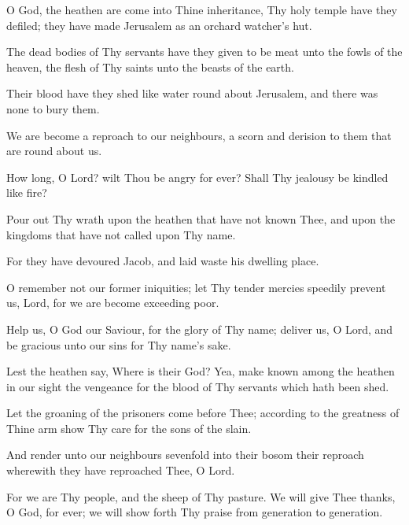 O God, the heathen are come into Thine inheritance, Thy holy temple have they defiled; they have made Jerusalem as an orchard watcher’s hut.

The dead bodies of Thy servants have they given to be meat unto the fowls of the heaven, the flesh of Thy saints unto the beasts of the earth.

Their blood have they shed like water round about Jerusalem, and there was none to bury them.

We are become a reproach to our neighbours, a scorn and derision to them that are round about us.

How long, O Lord? wilt Thou be angry for ever? Shall Thy jealousy be kindled like fire?

Pour out Thy wrath upon the heathen that have not known Thee, and upon the kingdoms that have not called upon Thy name.

For they have devoured Jacob, and laid waste his dwelling place.

O remember not our former iniquities; let Thy tender mercies speedily prevent us, Lord, for we are become exceeding poor.

Help us, O God our Saviour, for the glory of Thy name; deliver us, O Lord, and be gracious unto our sins for Thy name's sake.

Lest the heathen say, Where is their God? Yea, make known among the heathen in our sight the vengeance for the blood of Thy servants which hath been shed.

Let the groaning of the prisoners come before Thee; according to the greatness of Thine arm show Thy care for the sons of the slain.

And render unto our neighbours sevenfold into their bosom their reproach wherewith they have reproached Thee, O Lord.

For we are Thy people, and the sheep of Thy pasture. We will give Thee thanks, O God, for ever; we will show forth Thy praise from generation to generation.
